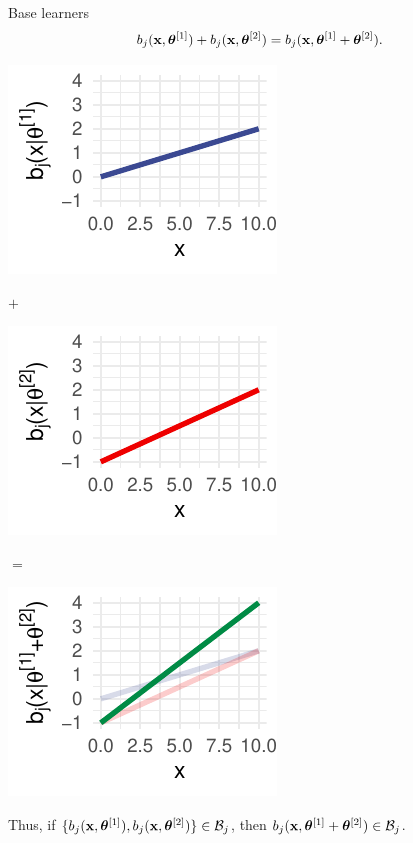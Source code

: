 \documentclass[11pt,compress,t,notes=noshow, xcolor=table]{beamer}
\begin{document}
\begin{vbframe}{Base learners}
$$
 b_j(\mathbf{x}, \bm{\theta}^{[1]}) + b_j(\mathbf{x}, \bm{\theta}^{[2]}) =
 b_j(\mathbf{x}, \bm{\theta}^{[1]} + \bm{\theta}^{[2]}).
$$
\begin{center}
\begin{minipage}{.25\linewidth}
\includegraphics{figure/boosting-cwb-bl-add1.pdf}
\end{minipage}
\begin{minipage}{.05\linewidth}
\vspace*{-0.3cm}
$\bm{+}$
\end{minipage}
\begin{minipage}{.25\linewidth}
\includegraphics{figure/boosting-cwb-bl-add2.pdf} 
\end{minipage}
\begin{minipage}{.05\linewidth}
\vspace*{-0.3cm}
$\bm{=}$
\end{minipage}
\begin{minipage}{.25\linewidth}
\includegraphics{figure/boosting-cwb-bl-add3.pdf}
\end{minipage}
\end{center}
\vspace*{0.1cm}

Thus, if $\{ b_j(\mathbf{x}, \bm{\theta}^{[1]}), b_j(\mathbf{x}, \bm{\theta}^{[2]}) \} \in \mathcal{B}_j$, then $b_j(\mathbf{x}, \bm{\theta}^{[1]} + \bm{\theta}^{[2]}) \in \mathcal{B}_j$.

\end{vbframe}
\end{document}
